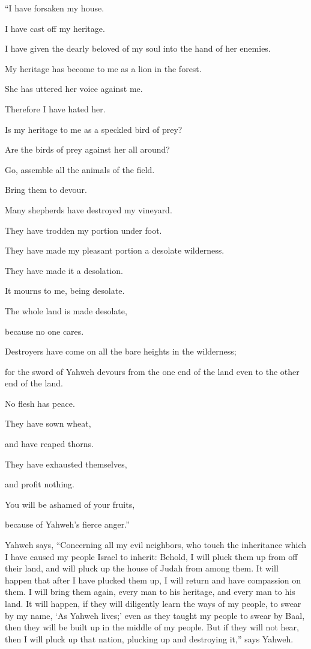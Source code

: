{\par }{\BB \par }{\Q {}“I have forsaken my house.
\par }{\QB I have cast off my heritage.
\par }{\QB I have given the dearly beloved of my soul into the hand of her enemies.
\par }{\Q {}My heritage has become to me as a lion in the forest.
\par }{\QB She has uttered her voice against me.
\par }{\QB Therefore I have hated her.
\par }{\Q {}Is my heritage to me as a speckled bird of prey?
\par }{\QB Are the birds of prey against her all around?
\par }{\Q Go, assemble all the animals of the field.
\par }{\QB Bring them to devour.
\par }{\Q {}Many shepherds have destroyed my vineyard.
\par }{\QB They have trodden my portion under foot.
\par }{\QB They have made my pleasant portion a desolate wilderness.
\par }{\Q {}They have made it a desolation.
\par }{\QB It mourns to me, being desolate.
\par }{\Q The whole land is made desolate,
\par }{\QB because no one cares.
\par }{\Q {}Destroyers have come on all the bare heights in the wilderness;
\par }{\QB for the sword of Yahweh devours from the one end of the land even to the other end of the land.
\par }{\QB No flesh has peace.
\par }{\Q {}They have sown wheat,
\par }{\QB and have reaped thorns.
\par }{\Q They have exhausted themselves,
\par }{\QB and profit nothing.
\par }{\Q You will be ashamed of your fruits,
\par }{\QB because of Yahweh’s fierce anger.”
\par }{\BB \par }{\PP {}Yahweh says, “Concerning all my evil neighbors, who touch the inheritance which I have caused my people Israel to inherit: Behold, I will pluck them up from off their land, and will pluck up the house of Judah from among them.
It will happen that after I have plucked them up, I will return and have compassion on them. I will bring them again, every man to his heritage, and every man to his land.
It will happen, if they will diligently learn the ways of my people, to swear by my name, ‘As Yahweh lives;’ even as they taught my people to swear by Baal, then they will be built up in the middle of my people.
But if they will not hear, then I will pluck up that nation, plucking up and destroying it,” says Yahweh.

}
